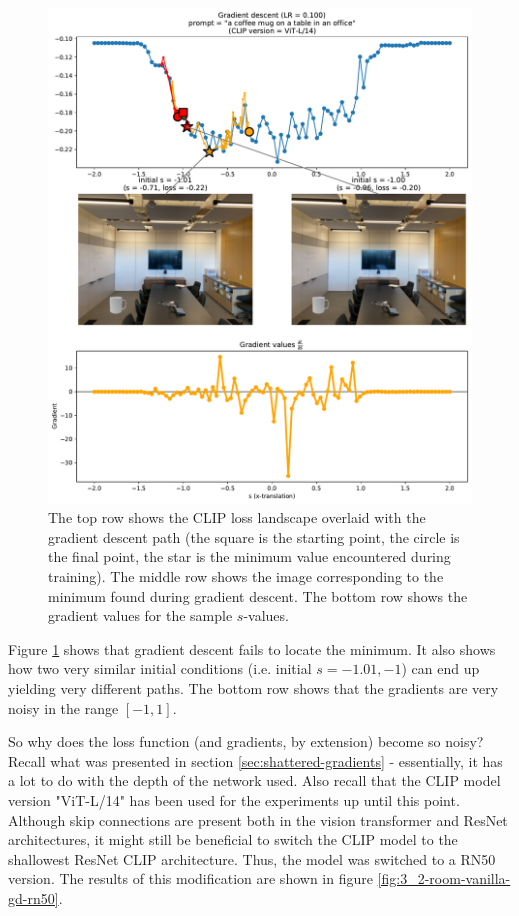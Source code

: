 \begin{figure}[H]
    \centering
    \includegraphics[width=1.0\textwidth]{figures/3_2-room-vanilla-gd.pdf}
    \caption{The top row shows the CLIP loss landscape overlaid with the gradient descent path (the square is the starting point, the circle is the final point, the star is the minimum value encountered during training). The middle row shows the image corresponding to the minimum found during gradient descent. The bottom row shows the gradient values for the sample $s$-values.}
    \label{fig:3_2-room-vanilla-gd}
\end{figure}

Figure \ref{fig:3_2-room-vanilla-gd} shows that gradient descent fails to locate the minimum. It also shows how two very similar initial conditions (i.e. initial $s={-1.01, -1}$) can end up yielding very different paths. The bottom row shows that the gradients are very noisy in the range $[-1,1]$.

So why does the loss function (and gradients, by extension) become so noisy? Recall what was presented in section \ref{sec:shattered-gradients} - essentially, it has a lot to do with the depth of the network used. Also recall that the CLIP model version "ViT-L/14" has been used for the experiments up until this point. Although skip connections are present both in the vision transformer and ResNet architectures, it might still be beneficial to switch the CLIP model to the shallowest ResNet CLIP architecture. Thus, the model was switched to a RN50 version. The results of this modification are shown in figure \ref{fig:3_2-room-vanilla-gd-rn50}.

